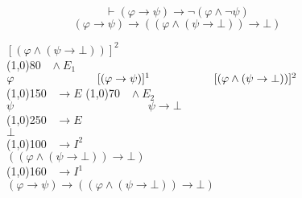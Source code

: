 \documentclass{article}
\theoremstyle{break}
\theoremstyle{break}
\theoremstyle{break}
\theoremstyle{break}
\begin{document}
\begin{figure}[H]
  \begin{exercise}[a casa]
    \[
      \vdash (\varphi \to \psi) \to \neg (\varphi \wedge \neg \psi)
    \] 
    \[
      (\varphi \to \psi) \to ((\varphi \wedge (\psi \to \bot)) \to \bot)
    \] 
    \begin{center}
      \hspace{-8cm}\( [(\varphi \wedge (\psi \to \bot))]^2 \) \\
      \hspace{-7cm}\line(1,0){80}\(\;\;\; \wedge E_1 \) \hspace{4cm}\\
      \hspace{1cm}\( \varphi \hspace{2.6cm}[(\varphi \to \psi)]^1 \hspace{1cm} \hspace{1cm} [(\varphi \wedge (\psi \to \bot))]^2\) \\
      \hspace{0.7cm}\line(1,0){150}\(\;\;\; \to E \) \hspace{0.8cm}\line(1,0){70}\(\;\;\; \wedge E_2 \)\\
      \hspace{2cm}\( \psi \hspace{5cm} \psi \to \bot\)\\ 
      \hspace{1cm}\line(1,0){250}\(\;\;\; \to E\)\\
      \( \bot \) \\
      \hspace{1cm}\line(1,0){100}\(\;\;\; \to I^2 \)\\
      \( ((\varphi \wedge (\psi \to \bot)) \to \bot) \) \\
      \hspace{1cm}\line(1,0){160}\(\;\;\; \to I^1 \)\\
      \( (\varphi \to \psi) \to ((\varphi \wedge (\psi \to \bot)) \to \bot) \)
    \end{center}
  \end{exercise}
\end{figure}
\end{document}
